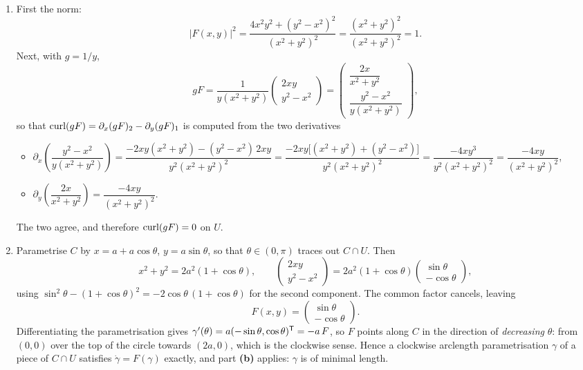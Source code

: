 \begin{exercisesolution}
\begin{enumerate}[label=\textbf{(\alph*)}]
  \item First the norm:
\[\lvert F(x,y)\rvert^2 = \frac{4x^2y^2 + (y^2-x^2)^2}{(x^2+y^2)^2} = \frac{(x^2+y^2)^2}{(x^2+y^2)^2} = 1.\]
Next, with $g = 1/y$,
\[gF = \frac{1}{y(x^2+y^2)} \begin{pmatrix} 2xy \\ y^2-x^2 \end{pmatrix} = \begin{pmatrix} \dfrac{2x}{x^2+y^2} \\[2mm] \dfrac{y^2-x^2}{y(x^2+y^2)} \end{pmatrix},\]
so that $\operatorname{curl}(gF) = \partial_x (gF)_2 - \partial_y (gF)_1$ is computed from the two derivatives
\begin{itemize}
  \item $\partial_x \left(\dfrac{y^2-x^2}{y(x^2+y^2)}\right)
    = \dfrac{-2xy(x^2+y^2) - (y^2-x^2)\,2xy}{y^2(x^2+y^2)^2}
    = \dfrac{-2xy\big[(x^2+y^2)+(y^2-x^2)\big]}{y^2(x^2+y^2)^2}
    = \dfrac{-4xy^3}{y^2(x^2+y^2)^2}
    = \dfrac{-4xy}{(x^2+y^2)^2}$,
  \item $\partial_y \left(\dfrac{2x}{x^2+y^2}\right) = \dfrac{-4xy}{(x^2+y^2)^2}$.
\end{itemize}
The two agree, and therefore $\operatorname{curl}(gF) = 0$ on $U$.

  \item Parametrise $C$ by $x = a + a\cos\theta$, $y = a\sin\theta$, so that $\theta \in (0,\pi)$
    traces out $C \cap U$. Then
\[x^2+y^2 = 2a^2(1+\cos\theta), \qquad
  \begin{pmatrix} 2xy \\ y^2-x^2 \end{pmatrix} = 2a^2(1+\cos\theta) \begin{pmatrix} \sin\theta \\ -\cos\theta \end{pmatrix},\]
    using $\sin^2\theta - (1+\cos\theta)^2 = -2\cos\theta\,(1+\cos\theta)$ for the second component.
    The common factor cancels, leaving
\[F(x,y) = \begin{pmatrix} \sin\theta \\ -\cos\theta \end{pmatrix}.\]
    Differentiating the parametrisation gives $\gamma'(\theta) = a(-\sin\theta, \cos\theta)^{\mathsf{T}} = -a\,F$,
    so $F$ points along $C$ in the direction of \emph{decreasing} $\theta$: from $(0,0)$ over the top
    of the circle towards $(2a,0)$, which is the clockwise sense. Hence a clockwise arclength
    parametrisation $\gamma$ of a piece of $C \cap U$ satisfies $\dot\gamma = F(\gamma)$ exactly, and
    part \textbf{(b)} applies: $\gamma$ is of minimal length.


\end{enumerate}
\end{exercisesolution}
